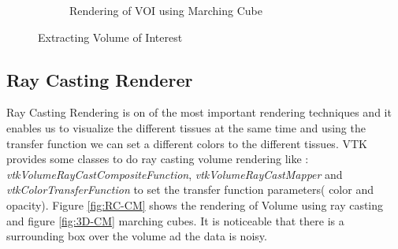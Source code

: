 \documentclass[10pt, b5paper]{article}
\begin{document}
\begin{figure}
\begin{subfigure}[b]{0.45\textwidth}
        \caption{Rendering of VOI using Marching Cube}
        \label{fig:VOI-RC}
    \end{subfigure}
    \caption{Extracting Volume of Interest}
    \label{fig:VOI}
\end{figure}

\subsection{Ray Casting Renderer}
Ray Casting Rendering is on of the most important rendering techniques and it enables us to visualize the different tissues at the same time and using the transfer function we can set a different colors to the different tissues. VTK provides some classes to do ray casting volume rendering like : \textit{vtkVolumeRayCastCompositeFunction}, \textit{vtkVolumeRayCastMapper} and \textit{vtkColorTransferFunction} to set the transfer function parameters( color and opacity). Figure \ref{fig:RC-CM} shows the rendering of Volume using ray casting and figure \ref{fig:3D-CM} marching cubes. 
It is noticeable that there is a surrounding box over the volume ad the data is noisy.
\end{document}

